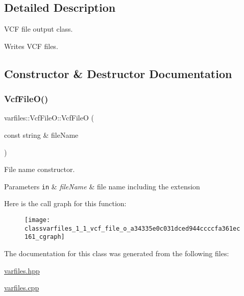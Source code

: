 \subsection{Detailed Description}
V\+CF file output class. 

Writes V\+CF files. 

\subsection{Constructor \& Destructor Documentation}
\mbox{\label{classvarfiles_1_1_vcf_file_o_a34335e0c031dced944ccccfa361ec161}} 
\subsubsection{\texorpdfstring{Vcf\+File\+O()}{VcfFileO()}}
{\footnotesize\ttfamily varfiles\+::\+Vcf\+File\+O\+::\+Vcf\+FileO (\begin{DoxyParamCaption}\item[{const string \&}]{file\+Name }\end{DoxyParamCaption})\hspace{0.3cm}{\ttfamily [inline]}}



File name constructor. 


\begin{DoxyParams}[1]{Parameters}
\mbox{\tt in}  & {\em file\+Name} & file name including the extension \\
\hline
\end{DoxyParams}
Here is the call graph for this function\+:\nopagebreak
\begin{figure}[H]
\begin{center}
\leavevmode
\texttt{[image: classvarfiles\_1\_1\_vcf\_file\_o\_a34335e0c031dced944ccccfa361ec161\_cgraph]}
\end{center}
\end{figure}


The documentation for this class was generated from the following files\+:\begin{DoxyCompactItemize}
\item 
\hyperlink{varfiles_8hpp}{varfiles.\+hpp}\item 
\hyperlink{varfiles_8cpp}{varfiles.\+cpp}\end{DoxyCompactItemize}
